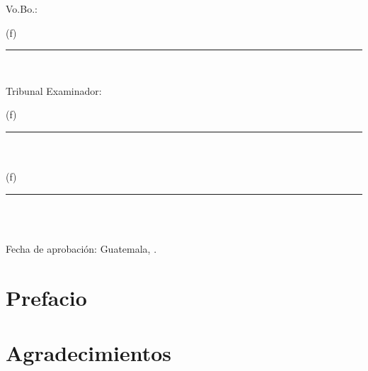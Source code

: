 \documentclass[10pt, letterpaper]{report}
\newcommand{\defaultparformat}[1]{
	{\setlength{\parskip}{2ex}
    }
}
\begin{document}
\ifdefined\CAPfirmas
	\newpage
	\thispagestyle{empty}
	\vspace*{0.5in}
	\large Vo.Bo.:\\[1cm]
	\begin{center}
		(f) \rule[1pt]{4 in}{1pt}\\
		\nombreasesor
	\end{center}
	\vspace{1in}

	Tribunal Examinador:\\[1cm]
	\begin{center}
		(f) \rule[1pt]{4 in}{1pt}\\
		\nombreasesor \\[1in]
		(f) \rule[1pt]{4 in}{1pt}\\
		\nombreprimerex \\[1in]
	\end{center}
	\vspace{1in}

	Fecha de aprobación: Guatemala, \fechaaprobacion.
	\normalsize
\fi

\ifdefined\CAPprefacio
	\newpage
	\cleardoublepage{}
    \chapter*{Prefacio}
    \ifdefined\parpordefecto
    	\defaultparformat{prefacio}
    \else
    	
    \fi
\fi

\ifdefined\CAPagradecimientos
	\newpage
    \cleardoublepage{}
	\chapter*{Agradecimientos}
	\ifdefined\parpordefecto
    	\defaultparformat{agradecimientos}
    \else
    	
    \fi 
\fi
\end{document}
